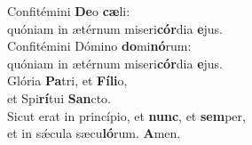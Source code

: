 \evenverse Confitémini \textbf{De}o \textbf{cæ}li:~\*\\
\evenverse quóniam in ætérnum miseri\textbf{cór}dia \textbf{e}jus.\\
\oddverse Confitémini Dómino \textbf{do}mi\textbf{nó}rum:~\*\\
\oddverse quóniam in ætérnum miseri\textbf{cór}dia \textbf{e}jus.\\
\evenverse Glória \textbf{Pa}tri, et \textbf{Fí}\textbf{li}o,~\*\\
\evenverse et Spi\textbf{rí}tui \textbf{San}cto.\\
\oddverse Sicut erat in princípio, et \textbf{nunc}, et \textbf{sem}per,~\*\\
\oddverse et in sǽcula sæcu\textbf{ló}rum. \textbf{A}men.\\
